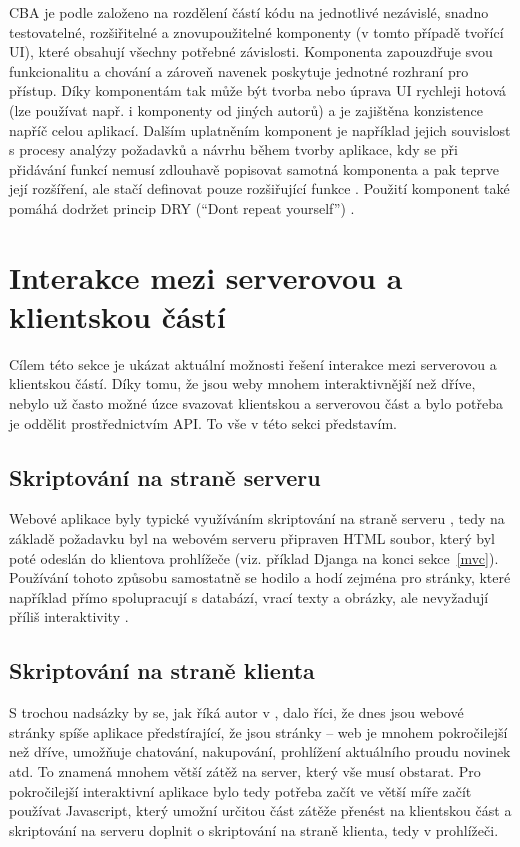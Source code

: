     CBA je podle \cite{cba3} založeno na rozdělení částí kódu na jednotlivé nezávislé, snadno testovatelné, rozšiřitelné a znovupoužitelné komponenty (v tomto případě tvořící UI), které obsahují všechny potřebné závislosti. Komponenta zapouzdřuje svou funkcionalitu a chování a zároveň navenek poskytuje jednotné rozhraní pro přístup. Díky komponentám tak může být tvorba nebo úprava UI rychleji hotová (lze používat např. i komponenty od jiných autorů) a je zajištěna konzistence napříč celou aplikací. Dalším uplatněním komponent je například jejich souvislost s procesy analýzy požadavků a návrhu během tvorby aplikace, kdy se při přidávání funkcí nemusí zdlouhavě popisovat samotná komponenta a pak teprve její rozšíření, ale stačí definovat pouze rozšiřující funkce \cite{cba1}. Použití komponent také pomáhá dodržet princip DRY (\enquote{Don\textquotesingle t repeat yourself}) \cite{cba2}.
    
    \section{Interakce mezi serverovou a klientskou částí}\label{interakce}
    Cílem této sekce je ukázat aktuální možnosti řešení interakce mezi serverovou a klientskou částí. Díky tomu, že jsou weby mnohem interaktivnější než dříve, nebylo už často možné úzce svazovat klientskou a serverovou část a bylo potřeba je oddělit prostřednictvím API. To vše v této sekci představím.
    
        \subsection{Skriptování na straně serveru}
        Webové aplikace byly typické využíváním skriptování na straně serveru \cite{moderni-webapps}, tedy na základě požadavku byl na webovém serveru připraven HTML soubor, který byl poté odeslán do klientova prohlížeče \cite{scripting-sqa} (viz. příklad Djanga na konci sekce~\ref{mvc}). Používání tohoto způsobu samostatně se hodilo a hodí zejména pro stránky, které například přímo spolupracují s databází, vrací texty a obrázky, ale nevyžadují příliš interaktivity \cite{scripting-freecodecamp}.
        
        \subsection{Skriptování na straně klienta}\label{client-side-scripting}
        S trochou nadsázky by se, jak říká autor v \cite{scripting-freecodecamp}, dalo říci, že dnes jsou webové stránky spíše aplikace předstírající, že jsou stránky -- web je mnohem pokročilejší než dříve, umožňuje chatování, nakupování, prohlížení aktuálního proudu novinek atd. To znamená mnohem větší zátěž na server, který vše musí obstarat. Pro pokročilejší interaktivní aplikace bylo tedy potřeba začít ve větší míře začít používat Javascript, který umožní určitou část zátěže přenést na klientskou část \cite{scripting-upwork} a skriptování na serveru doplnit o skriptování na straně klienta, tedy v prohlížeči.
        
